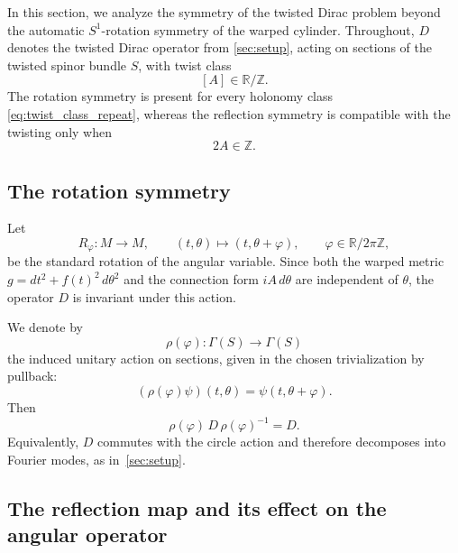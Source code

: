 \documentclass[11pt]{article}
\theoremstyle{definition}
\numberwithin{equation}{section}
\begin{document}
In this section, we analyze the symmetry of the twisted Dirac problem beyond the automatic
\(S^1\)-rotation symmetry of the warped cylinder. Throughout, \(D\) denotes the twisted Dirac
operator from \autoref{sec:setup}, acting on sections of the twisted spinor bundle \(S\),
with twist class
\begin{equation}\label{eq:twist_class_repeat}
[A]\in \mathbb R/\mathbb Z.
\end{equation}
The rotation symmetry is present for every holonomy class \eqref{eq:twist_class_repeat},
whereas the reflection symmetry is compatible with the twisting only when
\begin{equation}\label{eq:2A_intro}
2A\in\mathbb Z.
\end{equation}

\subsection{The rotation symmetry}

Let
\begin{equation}\label{eq:rotation_map}
R_\varphi:M\longrightarrow M,
\qquad
(t,\theta) \mapsto(t,\theta+\varphi),
\qquad
\varphi\in\mathbb R/2\pi\mathbb Z,
\end{equation}
be the standard rotation of the angular variable. Since both the warped metric $g=dt^2+f(t)^2\,d\theta^2$ and the connection form $ iA\,d\theta $
are independent of \(\theta\), the operator \(D\) is invariant under this action.

We denote by
\begin{equation}\label{eq:rotation_rep}
\rho(\varphi):\Gamma(S)\longrightarrow \Gamma(S)
\end{equation}
the induced unitary action on sections, given in the chosen trivialization by pullback:
\begin{equation}\label{eq:rotation_pullback}
(\rho(\varphi)\psi)(t,\theta)=\psi(t,\theta+\varphi).
\end{equation}
Then
\begin{equation}\label{eq:D_rotation_commute}
\rho(\varphi)\,D\,\rho(\varphi)^{-1}=D.
\end{equation}
Equivalently, \(D\) commutes with the circle action and therefore decomposes into Fourier modes, as in~\autoref{sec:setup}.

\subsection{The reflection map and its effect on the angular operator}
\end{document}
